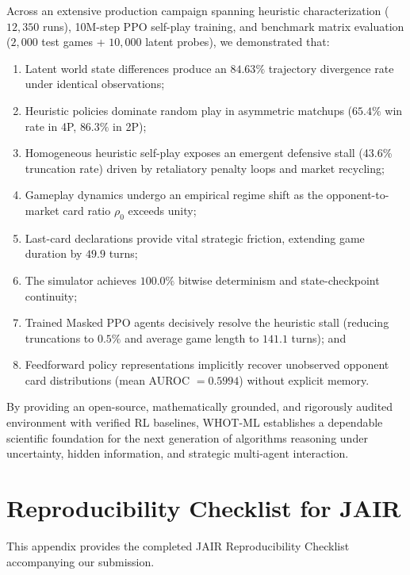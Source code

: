 \documentclass[11pt]{article}
\begin{document}
Across an extensive production campaign spanning heuristic characterization ($12{,}350$ runs), 10M-step PPO self-play training, and benchmark matrix evaluation ($2{,}000$ test games + $10{,}000$ latent probes), we demonstrated that:
\begin{enumerate}
  \item Latent world state differences produce an $84.63\%$ trajectory divergence rate under identical observations;
  \item Heuristic policies dominate random play in asymmetric matchups ($65.4\%$ win rate in 4P, $86.3\%$ in 2P);
  \item Homogeneous heuristic self-play exposes an emergent defensive stall (43.6\% truncation rate) driven by retaliatory penalty loops and market recycling;
  \item Gameplay dynamics undergo an empirical regime shift as the opponent-to-market card ratio $\rho_0$ exceeds unity;
  \item Last-card declarations provide vital strategic friction, extending game duration by $49.9$ turns;
  \item The simulator achieves $100.0\%$ bitwise determinism and state-checkpoint continuity;
  \item Trained Masked PPO agents decisively resolve the heuristic stall (reducing truncations to $0.5\%$ and average game length to $141.1$ turns); and
  \item Feedforward policy representations implicitly recover unobserved opponent card distributions (mean AUROC $= 0.5994$) without explicit memory.
\end{enumerate}

By providing an open-source, mathematically grounded, and rigorously audited environment with verified RL baselines, WHOT-ML establishes a dependable scientific foundation for the next generation of algorithms reasoning under uncertainty, hidden information, and strategic multi-agent interaction.







\appendix
\section{Reproducibility Checklist for JAIR}
\label{sec:reproducibility_checklist}

This appendix provides the completed JAIR Reproducibility Checklist accompanying our submission.
\end{document}
